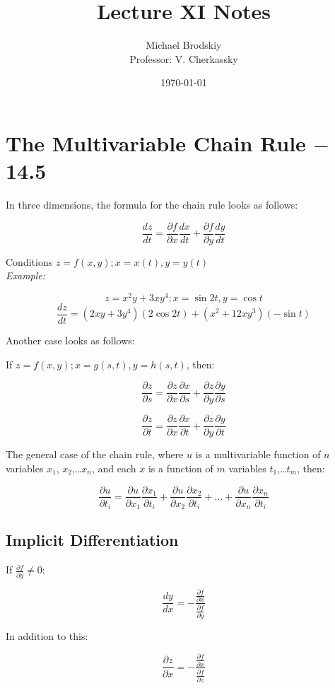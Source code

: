 \documentclass[12pt]{article}
\title{Lecture XI Notes}
\date{\today}
\author{Michael Brodskiy\\ \small Professor: V. Cherkassky}
\begin{document}
\maketitle

\section{The Multivariable Chain Rule $-$ 14.5}

In three dimensions, the formula for the chain rule looks as follows:

$$\frac{dz}{dt}=\frac{\partial f}{\partial x}\frac{dx}{dt} + \frac{\partial f}{\partial y}\frac{dy}{dt}$$

Conditions $z=f(x,y); x=x(t), y=y(t)$\\

\textit{Example:}

$$z=x^2y+3xy^4; x=\sin2t,y=\cos t$$
$$\frac{dz}{dt}=(2xy+3y^4)(2\cos2t)+(x^2+12xy^3)(-\sin t)$$

Another case looks as follows:

If $z=f(x,y); x=g(s,t), y=h(s,t)$, then:

$$\frac{\partial z}{\partial s}=\frac{\partial z}{\partial x}\frac{\partial x}{\partial s} + \frac{\partial z}{\partial y}\frac{\partial y}{\partial s}$$

$$\frac{\partial z}{\partial t}=\frac{\partial z}{\partial x}\frac{\partial x}{\partial t} + \frac{\partial z}{\partial y}\frac{\partial y}{\partial t}$$

The general case of the chain rule, where $u$ is a multivariable function of $n$ variables $x_1$, $x_2$,\dots $x_n$, and each $x$ is a function of $m$ variables $t_1$,\dots$t_m$, then:

$$\frac{\partial u}{\partial t_i}=\frac{\partial u}{\partial x_1}\frac{\partial x_1}{\partial t_i}+\frac{\partial u}{\partial x_2}\frac{\partial x_2}{\partial t_i}+\dots+\frac{\partial u}{\partial x_n}\frac{\partial x_n}{\partial t_i}$$

\subsection{Implicit Differentiation}

If $\frac{\partial f}{\partial y}\neq 0$:

$$\frac{dy}{dx}=-\frac{\frac{\partial f}{\partial x}}{\frac{\partial f}{\partial y}}$$

In addition to this:

$$\frac{\partial z}{\partial x}=-\frac{\frac{\partial f}{\partial x}}{\frac{\partial f}{\partial z}}$$
\end{document}
